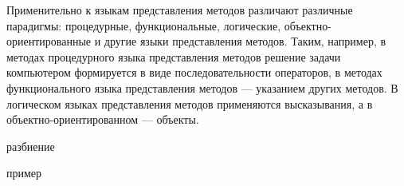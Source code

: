 \begin{itemize}
Применительно к языкам представления методов различают различные парадигмы: процедурные, функциональные, логические,
объектно-ориентированные и другие языки представления методов. Таким, например, в методах процедурного языка
представления методов решение задачи компьютером формируется в виде последовательности операторов, в методах
функционального языка представления методов — указанием других методов. В логическом языках представления методов
применяются высказывания, а в объектно-ориентированном — объекты.

\begin{SCn}
\begin{scnindent}
\end{scnindent}
\begin{scnindent}
\end{scnindent}
\begin{scnindent}
    \begin{scneqtoset}
        \begin{scnindent}
            \begin{scnrelfromset}{разбиение}
            \end{scnrelfromset}
        \end{scnindent}
        \begin{scnindent}
            \begin{scnhaselementrolelist}{пример}
            \end{scnhaselementrolelist}
        \end{scnindent}
    \end{scneqtoset}
\end{scnindent}
\begin{scnindent}

\end{scnindent}
\end{SCn}
\end{itemize}

